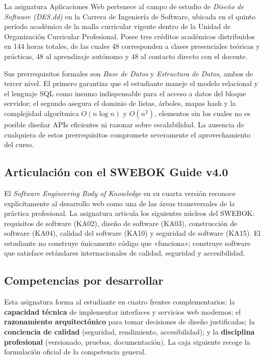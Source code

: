 La asignatura Aplicaciones Web pertenece al campo de estudio de
\emph{Diseño de Software (DES.dd)} en la Carrera de Ingeniería de
Software, ubicada en el quinto período académico de la malla curricular
vigente dentro de la Unidad de Organización Curricular Profesional.
Posee tres créditos académicos distribuidos en 144 horas totales, de
las cuales 48 corresponden a clases presenciales teóricas y prácticas,
48 al aprendizaje autónomo y 48 al contacto directo con el docente.

Sus prerrequisitos formales son \emph{Base de Datos} y \emph{Estructura
de Datos}, ambos de tercer nivel. El primero garantiza que el
estudiante maneje el modelo relacional y el lenguaje SQL como insumo
indispensable para el acceso a datos del bloque servidor; el segundo
asegura el dominio de listas, árboles, mapas hash y la complejidad
algorítmica $O(n\log n)$ y $O(n^2)$, elementos sin los cuales no es
posible diseñar APIs eficientes ni razonar sobre escalabilidad. La
ausencia de cualquiera de estos prerrequisitos compromete severamente
el aprovechamiento del curso.

\subsection{Articulación con el SWEBOK Guide v4.0}

El \emph{Software Engineering Body of Knowledge} en su cuarta versión
\cite{washizaki2024swebok} reconoce explícitamente al desarrollo web
como una de las áreas transversales de la práctica profesional. La
asignatura articula los siguientes núcleos del SWEBOK: requisitos de
software (KA02), diseño de software (KA03), construcción de software
(KA04), calidad del software (KA10) y seguridad de software (KA15). El
estudiante no construye únicamente código que «funciona»; construye
software que satisface estándares internacionales de calidad,
seguridad y accesibilidad.

\subsection{Competencias por desarrollar}

Esta asignatura forma al estudiante en cuatro frentes complementarios:
la \textbf{capacidad técnica} de implementar interfaces y servicios
web modernos; el \textbf{razonamiento arquitectónico} para tomar
decisiones de diseño justificadas; la \textbf{conciencia de calidad}
(seguridad, rendimiento, accesibilidad); y la \textbf{disciplina
profesional} (versionado, pruebas, documentación). La caja siguiente
recoge la formulación oficial de la competencia general.


